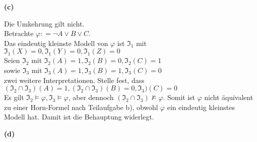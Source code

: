 \documentclass[11pt, a4paper]{article}
\newcommand{\defgr}{\mathrel{\mathop:\!\!=}}
\begin{document}
\textbf{(c)}
\begin{adjustwidth}{20pt}{20pt}
Die Umkehrung gilt nicht.\\

Betrachte $\varphi \defgr \neg A \vee B \vee C$.\\
 Das eindeutig kleinste Modell von $\varphi$ ist $\mathfrak{I_1}$ mit $\mathfrak{I_1}(X)=0,\mathfrak{I_1}(Y)=0,\mathfrak{I_1}(Z)=0$\\
 
 \noindent Seien $\mathfrak{I_2}$ mit $\mathfrak{I_2}(A)=1,\mathfrak{I_2}(B)=0,\mathfrak{I_2}(C)=1$\\
 sowie $\mathfrak{I_3}$ mit $\mathfrak{I_3}(A)=1,\mathfrak{I_3}(B)=1,\mathfrak{I_3}(C)=0$\\ zwei weitere Interpretationen. Stelle fest, dass\\
 
 $(\mathfrak{I_2} \cap \mathfrak{I_3})(A)=1,(\mathfrak{I_2} \cap \mathfrak{I_3})(B)=0,\mathfrak{I_3})(C)=0$\\
 
\noindent Es gilt $\mathfrak{I_2}  \models \varphi,\mathfrak{I_3} \models \varphi$, aber dennoch $(\mathfrak{I_2} \cap \mathfrak{I_3}) \not \models \varphi$. Somit ist $\varphi$ nicht äquivalent zu einer Horn-Formel nach Teilaufgabe b), obwohl $\varphi$ ein eindeutig kleinstes Modell hat. Damit ist die Behauptung widerlegt.

\end{adjustwidth}
\textbf{(d)}
\end{document}

